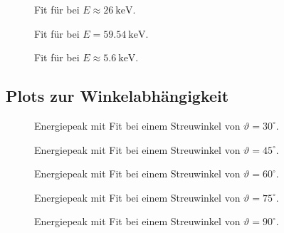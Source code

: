 \documentclass[slug=CS, room=Andreas-Schubert-Bau\,\ Labor\ 406,
supervisor=Juliane\ Volkmer, coursedate=29.\ 11.\ 2019]{../../Lab_Report_LaTeX/lab_report}
\newcommand{\am}{\ce{^241Am} }
\newcommand{\kev}[1]{\SI{#1}{\kilo\electronvolt}}
\begin{document}
\begin{figure}[H]\centering
  
  \caption{Fit f\"ur \am bei \(E \approx \kev{26}\).}
\end{figure}

\begin{figure}[H]\centering
  
  \caption{Fit f\"ur \am bei \(E = \kev{59,54}\).}
\end{figure}

\begin{figure}[H]\centering
  
  \caption{Fit f\"ur  bei \(E \approx \kev{5,6}\).}
\end{figure}

\subsection{Plots zur Winkelabh\"angigkeit}
\label{sec:anangplot}

\begin{figure}[H]\centering
  
  \caption{Energiepeak mit Fit bei einem Streuwinkel von \(\vartheta = 30^\circ\).}
  \label{fig:30}
\end{figure}

\begin{figure}[H]\centering
  
  \caption{Energiepeak mit Fit bei einem Streuwinkel von \(\vartheta = 45^\circ\).}
  \label{fig:45}
\end{figure}

\begin{figure}[H]\centering
  
  \caption{Energiepeak mit Fit bei einem Streuwinkel von \(\vartheta = 60^\circ\).}
  \label{fig:60}
\end{figure}

\begin{figure}[H]\centering
  
  \caption{Energiepeak mit Fit bei einem Streuwinkel von \(\vartheta = 75^\circ\).}
  \label{fig:75}
\end{figure}

\begin{figure}[H]\centering
  
  \caption{Energiepeak mit Fit bei einem Streuwinkel von \(\vartheta = 90^\circ\).}
  \label{fig:90}
\end{figure}
\end{document}

